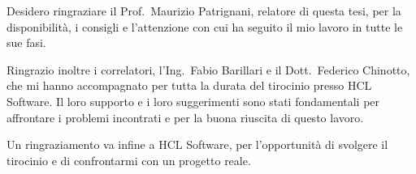 Desidero ringraziare il Prof.\ Maurizio Patrignani, relatore di questa tesi, per la disponibilità, i consigli e l'attenzione con cui ha seguito il mio lavoro in tutte le sue fasi.

Ringrazio inoltre i correlatori, l'Ing.\ Fabio Barillari e il Dott.\ Federico Chinotto, che mi hanno accompagnato per tutta la durata del tirocinio presso HCL Software. Il loro supporto e i loro suggerimenti sono stati fondamentali per affrontare i problemi incontrati e per la buona riuscita di questo lavoro.

Un ringraziamento va infine a HCL Software, per l'opportunità di svolgere il tirocinio e di confrontarmi con un progetto reale.

